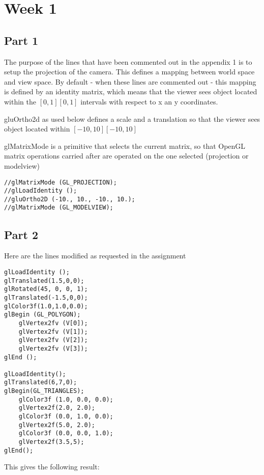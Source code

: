 \chapter{Week 1}

\section{Part 1}
The purpose of the lines that have been commented out in the appendix 1 is to
setup the projection of the camera. This defines a mapping between world space
and view space. By default - when these lines are commented out - this mapping
is defined by an identity matrix, which means that the viewer sees object located
within the $[0,1][0,1]$ intervals with respect to x an y coordinates.

gluOrtho2d as used below defines a scale and a translation so that the viewer sees object
located within $[-10,10][-10,10]$    


glMatrixMode is a primitive that selects the current matrix, so that OpenGL matrix
operations carried after are operated on the one selected (projection or modelview)

\begin{verbatim}
//glMatrixMode (GL_PROJECTION);
//glLoadIdentity ();
//gluOrtho2D (-10., 10., -10., 10.);
//glMatrixMode (GL_MODELVIEW);
\end{verbatim}

\section{Part 2}

Here are the lines modified as requested in the assignment
\begin{lstlisting}[caption=Snapshot from Part2.cpp]
glLoadIdentity ();
glTranslated(1.5,0,0);
glRotated(45, 0, 0, 1);
glTranslated(-1.5,0,0);
glColor3f(1.0,1.0,0.0);
glBegin (GL_POLYGON);
    glVertex2fv (V[0]);
    glVertex2fv (V[1]);
    glVertex2fv (V[2]);
    glVertex2fv (V[3]);
glEnd ();

glLoadIdentity();
glTranslated(6,7,0);
glBegin(GL_TRIANGLES);
    glColor3f (1.0, 0.0, 0.0);
    glVertex2f(2.0, 2.0);
    glColor3f (0.0, 1.0, 0.0);
    glVertex2f(5.0, 2.0);
    glColor3f (0.0, 0.0, 1.0);
    glVertex2f(3.5,5);
glEnd();
\end{lstlisting}

This gives the following result:




